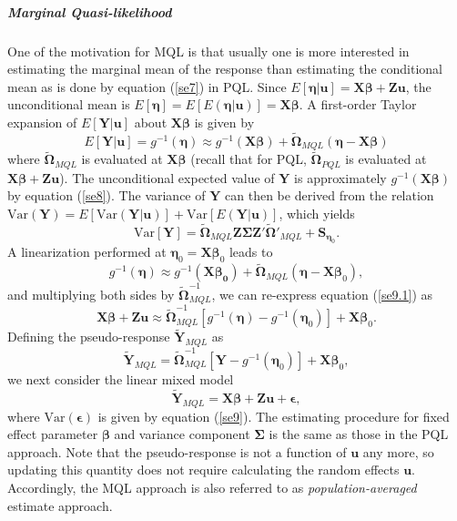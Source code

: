 \subparagraph*{Marginal Quasi-likelihood} 
One of the motivation for MQL is that usually one is more interested in estimating the marginal
mean of the response than estimating the conditional mean as is done by equation (\ref{se7}) in
PQL. Since $E[\bm \eta|\bm u]= \bm {X\beta} + \bm {Zu}$, the unconditional mean is $E[\bm \eta] =
E[E(\bm \eta|\bm u)]= \bm {X\beta}$. A first-order Taylor expansion of $E[\bm Y|\bm u]$ about $\bm X
\bm\beta$ is given by 
\begin{equation}\label{se8}
	E[\bm Y|\bm u] = g^{-1}(\bm \eta) \approx g^{-1} (\bm{X\beta}) + \tilde{\bm \Omega}_{MQL} (\bm
	\eta - \bm X\bm \beta)
\end{equation}
where $\tilde{\bm \Omega}_{MQL}$ is evaluated at $\bm {X\beta}$ (recall that for PQL, $\tilde{\bm
	\Omega}_{PQL}$ is evaluated at $\bm {X\beta} + \bm {Zu}$). The unconditional expected value of 
$\bm
Y$ is approximately $g^{-1}(\bm {X\beta})$ by equation (\ref{se8}). The variance of $\bm Y$ can then
be derived from the relation $\text{Var}(\bm Y)= E[\text{Var}(\bm Y|\bm u)] + \text{Var}[E(\bm Y|
\bm u)]$, which yields
\begin{equation}\label{se9}
	\text{Var}[\bm Y] = \tilde{\bm \Omega}_{MQL} \bm {Z\Sigma Z'}\tilde{\bm \Omega}'_{MQL} + \bm
	S_{\bm \eta_0}.
\end{equation}
A linearization performed at $\bm \eta_0= \bm X \bm \beta_0$ leads to 
\begin{equation}\label{se9.1}
	g^{-1}(\bm \eta) \approx g^{-1} (\bm{X\beta_0}) + \tilde{\bm \Omega}_{MQL} (\bm \eta - \bm X\bm
	\beta_0),
\end{equation}
and multiplying both sides by $\tilde{\bm \Omega}_{MQL} ^{-1}$, we can re-express equation 
(\ref{se9.1}) as
\begin{equation}
\bm {X\beta} + \bm {Zu} \approx \tilde{\bm \Omega}_{MQL}^{-1}[g^{-1}(\bm\eta)- g^{-1}(\bm
\eta_0)]  + \bm{X}\bm \beta_0. 
\end{equation}
Defining the pseudo-response $\tilde{\bm Y}_{MQL}$ as
\begin{equation}\label{se10}
	\tilde{\bm Y}_{MQL} =  \tilde{\bm \Omega}_{MQL}^{-1}[\bm Y- g^{-1}(\bm \eta_0)]  + \bm{X}\bm
	\beta_0,  
\end{equation}
we next consider the linear mixed model 
\[ \tilde{\bm Y}_{MQL}  = \bm {X\beta}+ \bm {Zu}  + \bm \epsilon, \] 
where $\text{Var}(\bm \epsilon) $ is given by equation (\ref{se9}).  The estimating procedure for
fixed effect parameter $\bm \beta$ and variance component $\bm \Sigma$ is the same as those in the 
PQL approach.
Note that the pseudo-response is not a function of $\bm u$ any more, so updating this quantity does
not require calculating the random effects $\bm u$. Accordingly, the MQL approach is also referred 
to as \textit{population-averaged} estimate approach.

